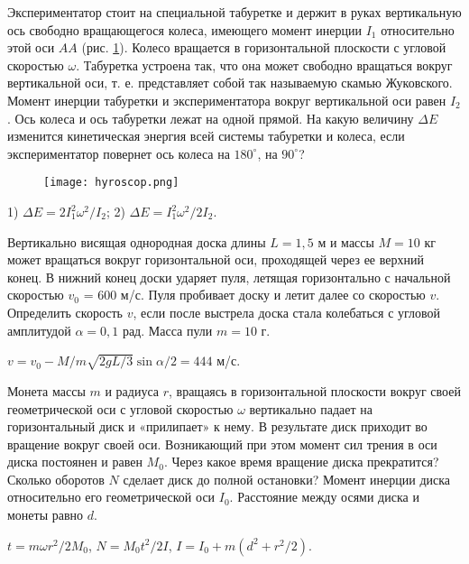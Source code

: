 \begin{ex} %
Экспериментатор стоит на специальной табуретке и держит в руках вертикальную ось свободно вращающегося колеса, имеющего момент инерции $I_1$ относительно этой оси $AA$ (рис. \ref{hyroscop}). Колесо вращается в горизонтальной плоскости с угловой скоростью $\omega$. Табуретка устроена так, что она может свободно вращаться вокруг вертикальной оси, т. е. представляет собой так называемую скамью Жуковского. Момент инерции табуретки и экспериментатора вокруг вертикальной оси равен $I_2$. Ось колеса и ось табуретки лежат на одной прямой. На какую величину $\Delta E$ изменится кинетическая энергия всей системы табуретки и колеса, если экспериментатор повернет ось колеса на $180^{\circ}$, на $90^{\circ}$?

\begin{figure}[h]
\centering
\texttt{[image: hyroscop.png]}
\caption{}
\label{hyroscop}
\end{figure}

\begin{ans}
1) $\Delta E = 2I_1^2\omega^2/I_2$; 2) $\Delta E = I_1^2\omega^2/2I_2$.
\end{ans}
\end{ex}	

\complexProblems

\begin{ex} %
Вертикально висящая однородная доска длины $L = 1,5$ м и массы $M = 10$ кг может вращаться вокруг горизонтальной оси, проходящей через ее верхний конец. В нижний конец доски ударяет пуля, летящая горизонтально с начальной скоростью $v_0$ = 600 м/с. Пуля пробивает доску и летит далее со скоростью $v$. Определить скорость $v$, если после выстрела доска стала колебаться с угловой амплитудой $\alpha  = 0,1$ рад. Масса пули $m = 10$ г.
\begin{ans}
$v = v_0 -M/m \sqrt{2gL/3} \sin \alpha /2 = 444$ м/с.
\end{ans}
\end{ex}	


\begin{ex} %
Монета массы $m$ и радиуса $r$, вращаясь в горизонтальной плоскости вокруг своей геометрической оси с угловой скоростью $\omega$ вертикально падает на горизонтальный диск и «прилипает» к нему. В результате диск приходит во вращение вокруг своей оси. Возникающий при этом момент сил трения в оси диска постоянен и равен $M_0$. Через какое время вращение диска прекратится? Сколько оборотов $N$ сделает диск до полной остановки? Момент инерции диска относительно его геометрической оси $I_0$. Расстояние между осями диска и монеты равно $d$.
\begin{ans}
$t = m\omega r^2 / 2M_0$, $N = M_0t^2/2I$, $I = I_0 + m(d^2 + r^2/2)$.
\end{ans}
\end{ex}	

